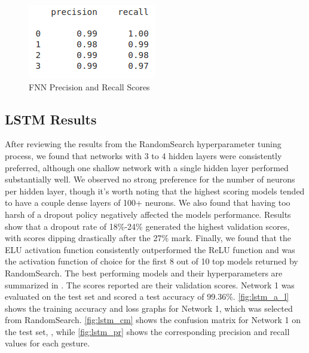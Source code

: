 \documentclass[journal]{IEEEtran}
\begin{document}
\begin{figure}[!t]
	\centering
	\includegraphics[width=0.46\linewidth]{FFNN_prec_rec}
	\caption{FNN Precision and Recall Scores}
	\label{fig:fnn_pr}
\end{figure}

\subsection{LSTM Results}
After reviewing the results from the RandomSearch hyperparameter tuning process, we found that networks with 3 to 4 hidden layers were consistently preferred, although one shallow network with a single hidden layer performed substantially well. We observed no strong preference for the number of neurons per hidden layer, though it’s worth noting that the highest scoring models tended to have a couple dense layers of 100+ neurons. We also found that having too harsh of a dropout policy negatively affected the models performance. Results show that a dropout rate of 18\%-24\% generated the highest validation scores, with scores dipping drastically after the 27\% mark. Finally, we found that the ELU activation function consistently outperformed the ReLU function and was the activation function of choice for the first 8 out of 10 top models returned by RandomSearch. The best performing models and their hyperparameters are summarized in . The scores reported are their validation scores. Network 1 was evaluated on the test set and scored a test accuracy of 99.36\%. \cref{fig:lstm_a_l} shows the training accuracy and loss graphs for Network 1, which was selected from RandomSearch. \cref{fig:lstm_cm} shows the confusion matrix for Network 1 on the test set, , while \cref{fig:lstm_pr} shows the corresponding precision and recall values for each gesture. 
\end{document}
